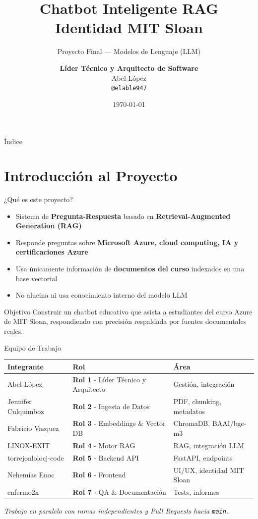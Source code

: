 \documentclass[aspectratio=169, 11pt]{beamer}
\title[Chatbot RAG MIT Sloan]{\textbf{Chatbot Inteligente RAG} \\ Identidad MIT Sloan}
\subtitle{Proyecto Final --- Modelos de Lenguaje (LLM)}
\author[\textbf{Abel López --- Rol 1}]{\textbf{Líder Técnico y Arquitecto de Software} \\ Abel López \\ \texttt{@elable947}}
\institute[MIT Sloan]{MIT Sloan School of Management}
\date{\today}
\begin{document}
\frame{\titlepage}

\begin{frame}{Índice}
\tableofcontents
\end{frame}

\section{Introducción al Proyecto}

\begin{frame}{¿Qué es este proyecto?}
\begin{itemize}
    \item Sistema de \textbf{Pregunta-Respuesta} basado en \textbf{Retrieval-Augmented Generation (RAG)}
    \item Responde preguntas sobre \textbf{Microsoft Azure, cloud computing, IA y certificaciones Azure}
    \item Usa únicamente información de \textbf{documentos del curso} indexados en una base vectorial
    \item No alucina ni usa conocimiento interno del modelo LLM
\end{itemize}

\vspace{0.5cm}
\begin{block}{Objetivo}
Construir un chatbot educativo que asista a estudiantes del curso Azure de MIT Sloan, respondiendo con precisión respaldada por fuentes documentales reales.
\end{block}
\end{frame}

\begin{frame}{Equipo de Trabajo}
\begin{table}
\small
\begin{tabular}{lll}
\toprule
\textbf{Integrante} & \textbf{Rol} & \textbf{Área} \\
\midrule
Abel López & \textbf{Rol 1} - Líder Técnico y Arquitecto & Gestión, integración \\
Jennifer Culquimboz & \textbf{Rol 2} - Ingesta de Datos & PDF, chunking, metadatos \\
Fabricio Vasquez & \textbf{Rol 3} - Embeddings \& Vector DB & ChromaDB, BAAI/bge-m3 \\
LINOX-EXIT & \textbf{Rol 4} - Motor RAG & RAG, integración LLM \\
torrejonlolocj-code & \textbf{Rol 5} - Backend API & FastAPI, endpoints \\
Nehemías Enoc & \textbf{Rol 6} - Frontend & UI/UX, identidad MIT Sloan \\
enfermo2x & \textbf{Rol 7} - QA \& Documentación & Tests, informes \\
\bottomrule
\end{tabular}
\end{table}

\vspace{0.3cm}
\centering
\textit{Trabajo en paralelo con ramas independientes y Pull Requests hacia \texttt{main}.}
\end{frame}
\end{document}
